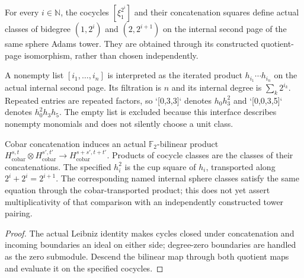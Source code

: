 \begin{definition}
  \label{def:milnor-internal-hi-family}
  \leanok
  For every $i\in\mathbb N$, the cocycles $[\xi_1^{2^i}]$ and their
  concatenation squares define actual classes of bidegree $(1,2^i)$ and
  $(2,2^{i+1})$ on the internal second page of the same sphere Adams tower.
  They are obtained through its constructed quotient-page isomorphism,
  rather than chosen independently.
\end{definition}

\begin{definition}
  \label{def:milnor-h-word-product}
  \leanok
  A nonempty list $[i_1,\ldots,i_n]$ is interpreted as the iterated
  product $h_{i_1}\cdots h_{i_n}$ on the actual internal second page. Its
  filtration is $n$ and its internal degree is
  $\sum_k 2^{i_k}$. Repeated entries are repeated factors, so `[0,3,3]`
  denotes $h_0h_3^2$ and `[0,0,3,5]` denotes $h_0^2h_3h_5$.
  The empty list is excluded because this interface describes nonempty
  monomials and does not silently choose a unit class.
\end{definition}

\begin{proposition}
  \label{prop:milnor-cobar-cup-descent}
  \leanok
  Cobar concatenation induces an actual $\mathbb F_2$-bilinear product
  $H^{s,t}_{\mathrm{cobar}}\otimes H^{s',t'}_{\mathrm{cobar}}
  \to H^{s+s',t+t'}_{\mathrm{cobar}}$.
  Products of cocycle classes are the classes of their concatenations.
  The specified $h_i^2$ is the cup square of $h_i$, transported along
  $2^i+2^i=2^{i+1}$. The corresponding named internal sphere classes satisfy
  the same equation through the cobar-transported product; this does not yet
  assert multiplicativity of that comparison with an independently constructed
  tower pairing.
\end{proposition}
\begin{proof}
  The actual Leibniz identity makes cycles closed under concatenation and
  incoming boundaries an ideal on either side; degree-zero boundaries
  are handled as the zero submodule. Descend the bilinear map through both
  quotient maps and evaluate it on the specified cocycles.
  \leanok
\end{proof}

